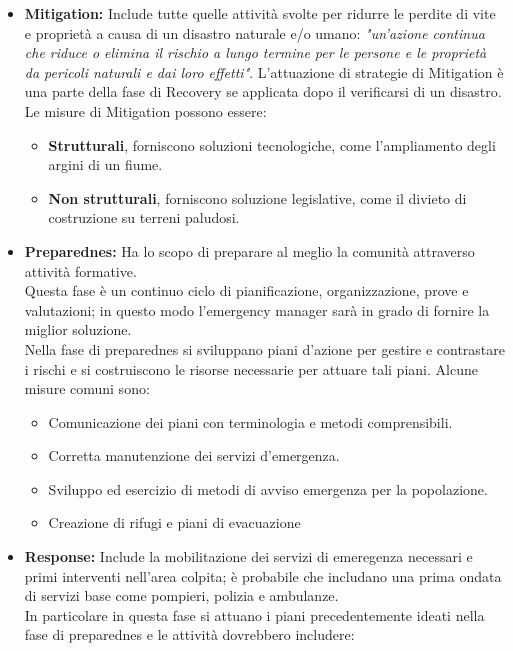  \begin{itemize}
 \item \textbf{Mitigation:} Include tutte quelle attività svolte per ridurre le perdite di vite e proprietà a causa di un disastro naturale e/o umano: \textit{"un'azione continua che riduce o elimina il rischio a lungo termine per le persone e le proprietà da pericoli naturali e dai loro effetti"}. L'attuazione di strategie di Mitigation è una parte della fase di Recovery se applicata dopo il verificarsi di un disastro.\\
Le misure di Mitigation possono essere:
\begin{itemize}
\item\textbf{Strutturali}, forniscono soluzioni tecnologiche, come l'ampliamento degli argini di un fiume.
\item\textbf{Non strutturali}, forniscono soluzione legislative, come il divieto di costruzione su terreni paludosi.
\end{itemize}
\item \textbf{Preparednes:} Ha lo scopo di preparare al meglio la comunità attraverso attività formative.\\
Questa fase è un continuo ciclo di pianificazione, organizzazione, prove e valutazioni; in questo modo l'emergency manager sarà in grado di fornire la miglior soluzione.\\
Nella fase di preparednes si sviluppano piani d'azione per gestire e contrastare i rischi e si costruiscono le risorse necessarie per attuare tali piani. Alcune misure comuni sono: 
\begin{itemize}
\item Comunicazione dei piani con terminologia e metodi comprensibili.
\item Corretta manutenzione dei servizi d'emergenza.
\item Sviluppo ed esercizio di metodi di avviso emergenza per la popolazione.
\item Creazione di rifugi e piani di evacuazione
\end{itemize}
\newpage
\item \textbf{Response:} Include la mobilitazione dei servizi di emeregenza necessari e primi interventi nell'area colpita; è probabile che includano una prima ondata di servizi base come pompieri, polizia e ambulanze. \\
In particolare in questa fase si attuano i piani precedentemente ideati nella fase di preparednes e le attività dovrebbero includere:
\begin{itemize}

\end{itemize}
\end{itemize}
